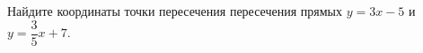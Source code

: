 \begin{ex}
	\begin{condition}
		Найдите координаты точки пересечения пересечения прямых \( y=3x-5 \) и \( y=\dfrac{3}{5}x+7 \).
	\end{condition}
\end{ex}